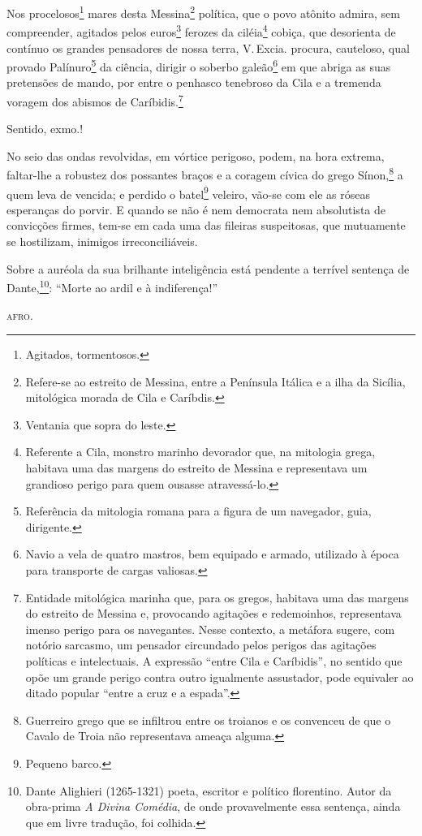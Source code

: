 Nos procelosos\footnote{Agitados, tormentosos.} mares desta
Messina\footnote{Refere-se ao estreito de Messina, entre a Península
Itálica e a ilha da Sicília, mitológica morada de Cila e Caríbdis.}
política, que o povo atônito admira, sem compreender, agitados pelos
euros\footnote{Ventania que sopra do leste.} ferozes da
ciléia\footnote{Referente a Cila, monstro marinho devorador que, na
  mitologia grega, habitava uma das margens do estreito de Messina e
  representava um grandioso perigo para quem ousasse atravessá-lo.}
cobiça, que desorienta de contínuo os grandes pensadores de nossa terra,
V.\,Excia. procura, cauteloso, qual provado Palínuro\footnote{
  Referência da mitologia romana para a figura de um navegador, guia,
  dirigente.} da ciência, dirigir o soberbo galeão\footnote{Navio a
  vela de quatro mastros, bem equipado e armado, utilizado à época para
  transporte de cargas valiosas.} em que abriga as suas pretensões de
mando, por entre o penhasco tenebroso da Cila e a tremenda voragem dos abismos de
Caríbidis.\footnote{Entidade mitológica marinha que, para os gregos,
  habitava uma das margens do estreito de Messina e, provocando
  agitações e redemoinhos, representava imenso perigo para os
  navegantes. Nesse contexto, a metáfora sugere, com notório sarcasmo,
  um pensador circundado pelos perigos das agitações políticas e
  intelectuais. A expressão ``entre Cila e Caríbidis'', no sentido que
  opõe um grande perigo contra outro igualmente assustador, pode
  equivaler ao ditado popular ``entre a cruz e a espada''.}

Sentido, exmo.!

No seio das ondas revolvidas, em vórtice perigoso, podem, na hora
extrema, faltar-lhe a robustez dos possantes braços e a coragem cívica
do grego Sínon,\footnote{Guerreiro grego que se infiltrou entre os
  troianos e os convenceu de que o Cavalo de Troia não representava
  ameaça alguma.} a quem leva de vencida; e perdido o batel\footnote{
  Pequeno barco.} veleiro, vão-se com ele as róseas esperanças do
porvir. E quando se não é nem democrata nem absolutista de convicções
firmes, tem-se em cada uma das fileiras suspeitosas, que mutuamente se
hostilizam, inimigos irreconciliáveis.

Sobre a auréola da sua brilhante inteligência está pendente a terrível
sentença de Dante,\footnote{Dante Alighieri (1265-1321) poeta,
  escritor e político florentino. Autor da obra-prima \emph{A Divina
  Comédia}, de onde provavelmente essa sentença, ainda que em livre
  tradução, foi colhida.}: ``Morte ao ardil e à indiferença!''
\begin{flushright}
\textsc{afro}.
\end{flushright}

